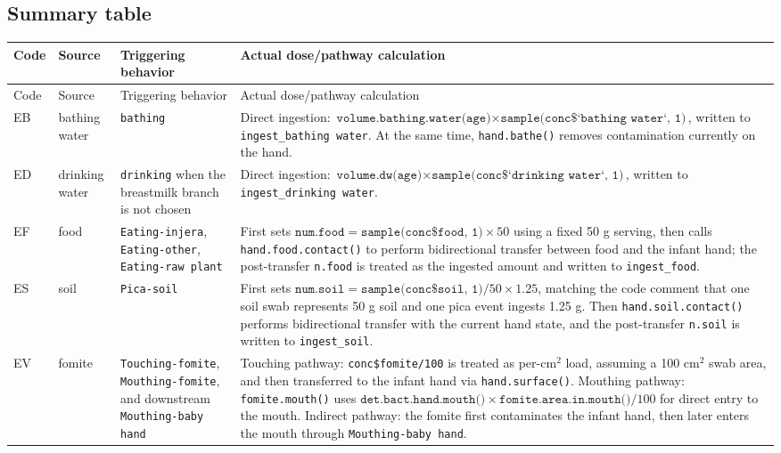 \documentclass[11pt]{article}
\begin{document}
\subsection{Summary table}
\begin{longtable}{p{1.2cm}p{2.5cm}p{3.4cm}p{6.8cm}}
\toprule
Code & Source & Triggering behavior & Actual dose/pathway calculation \\
\midrule
\endfirsthead
\toprule
Code & Source & Triggering behavior & Actual dose/pathway calculation \\
\midrule
\endhead
EB & bathing water & \texttt{bathing} & Direct ingestion: \(\texttt{volume.bathing.water(age)} \times \texttt{sample(conc\$`bathing water`, 1)}\), written to \texttt{ingest\_bathing water}. At the same time, \texttt{hand.bathe()} removes contamination currently on the hand. \\
ED & drinking water & \texttt{drinking} when the breastmilk branch is not chosen & Direct ingestion: \(\texttt{volume.dw(age)} \times \texttt{sample(conc\$`drinking water`, 1)}\), written to \texttt{ingest\_drinking water}. \\
EF & food & \texttt{Eating-injera}, \texttt{Eating-other}, \texttt{Eating-raw plant} & First sets \(\texttt{num.food} = \texttt{sample(conc\$food, 1)} \times 50\) using a fixed 50 g serving, then calls \texttt{hand.food.contact()} to perform bidirectional transfer between food and the infant hand; the post-transfer \texttt{n.food} is treated as the ingested amount and written to \texttt{ingest\_food}. \\
ES & soil & \texttt{Pica-soil} & First sets \(\texttt{num.soil} = \texttt{sample(conc\$soil, 1)}/50 \times 1.25\), matching the code comment that one soil swab represents 50 g soil and one pica event ingests 1.25 g. Then \texttt{hand.soil.contact()} performs bidirectional transfer with the current hand state, and the post-transfer \texttt{n.soil} is written to \texttt{ingest\_soil}. \\
EV & fomite & \texttt{Touching-fomite}, \texttt{Mouthing-fomite}, and downstream \texttt{Mouthing-baby hand} & Touching pathway: \texttt{conc\$fomite/100} is treated as per-\(\mathrm{cm}^2\) load, assuming a 100 \(\mathrm{cm}^2\) swab area, and then transferred to the infant hand via \texttt{hand.surface()}. Mouthing pathway: \texttt{fomite.mouth()} uses \(\texttt{det.bact.hand.mouth()} \times \texttt{fomite.area.in.mouth()}/100\) for direct entry to the mouth. Indirect pathway: the fomite first contaminates the infant hand, then later enters the mouth through \texttt{Mouthing-baby hand}. \\

\end{longtable}
\end{document}
